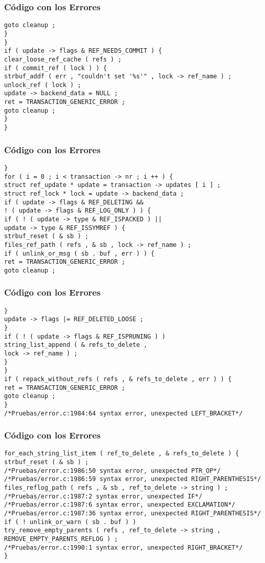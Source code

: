 \documentclass{beamer}
\begin{document}
\begin{frame}[fragile]
\frametitle{C\'odigo con los Errores}
\begin{verbatim}
goto cleanup ; 
} 
} 
if ( update -> flags & REF_NEEDS_COMMIT ) { 
clear_loose_ref_cache ( refs ) ; 
if ( commit_ref ( lock ) ) { 
strbuf_addf ( err , "couldn't set '%s'" , lock -> ref_name ) ; 
unlock_ref ( lock ) ; 
update -> backend_data = NULL ; 
ret = TRANSACTION_GENERIC_ERROR ; 
goto cleanup ; 
} 
} 
\end{verbatim}
\end{frame}
\begin{frame}[fragile]
\frametitle{C\'odigo con los Errores}
\begin{verbatim}
} 
for ( i = 0 ; i < transaction -> nr ; i ++ ) { 
struct ref_update * update = transaction -> updates [ i ] ; 
struct ref_lock * lock = update -> backend_data ; 
if ( update -> flags & REF_DELETING && 
! ( update -> flags & REF_LOG_ONLY ) ) { 
if ( ! ( update -> type & REF_ISPACKED ) || 
update -> type & REF_ISSYMREF ) { 
strbuf_reset ( & sb ) ; 
files_ref_path ( refs , & sb , lock -> ref_name ) ; 
if ( unlink_or_msg ( sb . buf , err ) ) { 
ret = TRANSACTION_GENERIC_ERROR ; 
goto cleanup ; 
\end{verbatim}
\end{frame}
\begin{frame}[fragile]
\frametitle{C\'odigo con los Errores}
\begin{verbatim}
} 
update -> flags |= REF_DELETED_LOOSE ; 
} 
if ( ! ( update -> flags & REF_ISPRUNING ) ) 
string_list_append ( & refs_to_delete , 
lock -> ref_name ) ; 
} 
} 
if ( repack_without_refs ( refs , & refs_to_delete , err ) ) { 
ret = TRANSACTION_GENERIC_ERROR ; 
goto cleanup ; 
} 
/*Pruebas/error.c:1984:64 syntax error, unexpected LEFT_BRACKET*/
\end{verbatim}
\end{frame}
\begin{frame}[fragile]
\frametitle{C\'odigo con los Errores}
\begin{verbatim}
for_each_string_list_item ( ref_to_delete , & refs_to_delete ) { 
strbuf_reset ( & sb ) ; 
/*Pruebas/error.c:1986:50 syntax error, unexpected PTR_OP*/
/*Pruebas/error.c:1986:59 syntax error, unexpected RIGHT_PARENTHESIS*/
files_reflog_path ( refs , & sb , ref_to_delete -> string ) ; 
/*Pruebas/error.c:1987:2 syntax error, unexpected IF*/
/*Pruebas/error.c:1987:6 syntax error, unexpected EXCLAMATION*/
/*Pruebas/error.c:1987:36 syntax error, unexpected RIGHT_PARENTHESIS*/
if ( ! unlink_or_warn ( sb . buf ) ) 
try_remove_empty_parents ( refs , ref_to_delete -> string , 
REMOVE_EMPTY_PARENTS_REFLOG ) ; 
/*Pruebas/error.c:1990:1 syntax error, unexpected RIGHT_BRACKET*/
} 
\end{verbatim}
\end{frame}
\end{document}

